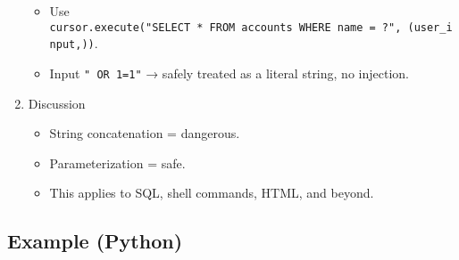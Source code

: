\documentclass[
  letterpaper,
  DIV=11,
  numbers=noendperiod]{scrreprt}
\providecommand{\tightlist}{%
  \setlength{\itemsep}{0pt}\setlength{\parskip}{0pt}}
\begin{document}
\begin{enumerate}
  \begin{itemize}
  \tightlist
  \item
    Use
    \texttt{cursor.execute("SELECT\ *\ FROM\ accounts\ WHERE\ name\ =\ ?",\ (user\_input,))}.
  \item
    Input
    \texttt{"\textquotesingle{}\ OR\ \textquotesingle{}1\textquotesingle{}=\textquotesingle{}1"}
    → safely treated as a literal string, no injection.
  \end{itemize}
\item
  Discussion

  \begin{itemize}
  \tightlist
  \item
    String concatenation = dangerous.
  \item
    Parameterization = safe.
  \item
    This applies to SQL, shell commands, HTML, and beyond.
  \end{itemize}
\end{enumerate}

\subsection{Example (Python)}\label{example-python-13}
\end{document}
